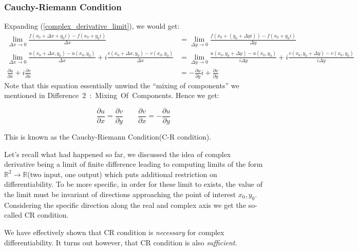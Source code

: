 \subsubsection{Cauchy-Riemann Condition}

Expanding (\ref{complex_derivative_limit}), we would get:
\begin{equation}
\begin{aligned}
\lim_{\Delta x\to 0} \frac{f(x_0+\Delta x + y_0i) - f(x_0+y_0i)}{\Delta x} &= \lim_{\Delta y\to 0} \frac{f(x_0 + (y_0+\Delta yi)) - f(x_0+y_0i)}{\Delta y} \\

\lim_{\Delta x\to 0}\frac{u(x_0+\Delta x, y_0)-u(x_0,y_0)}{\Delta x} + i \frac{v(x_0+\Delta x, y_0)-v(x_0,y_0)}{\Delta x} &=  
\lim_{\Delta y\to 0}\frac{u(x_0, y_0+\Delta y)-u(x_0,y_0)}{i\Delta y} + i \frac{v(x_0, y_0+\Delta y)-v(x_0,y_0)}{i\Delta y}\\

\frac{\partial u}{\partial x}+i\frac{\partial v}{\partial x} &= -\frac{\partial u}{\partial y}i + \frac{\partial v}{\partial y}
\end{aligned}
\end{equation}
Note that this equation essentially unwind the ``mixing of components'' we mentioned in Difference~2~:~Mixing~Of~Components. Hence we get:

\begin{equation}
\label{cr}
\boxed{\frac{\partial u}{\partial x} = \frac{\partial v}{\partial y} \qquad 
\frac{\partial v}{\partial x} =  - \frac{\partial u}{\partial y}}
\end{equation}

This is known as the Cauchy-Riemann Condition(C-R condition).

Let's recall what had happened so far, we discussed the idea of complex derivative being a limit of finite difference leading to computing limits of the form $\mathbb{R}^2\to \mathbb{R}$(two input, one output) which puts additional restriction on differentiability. To be more specific, in order for these limit to exists, the value of the limit must be invariant of directions approaching the point of interest $x_0, y_0$. Considering the specific direction along the real and complex axis we get the so-called CR condition.

We have effectively shown that CR condition is \textit{necessary} for complex differentiability. It turns out however, that CR condition is also \textit{sufficient}.

